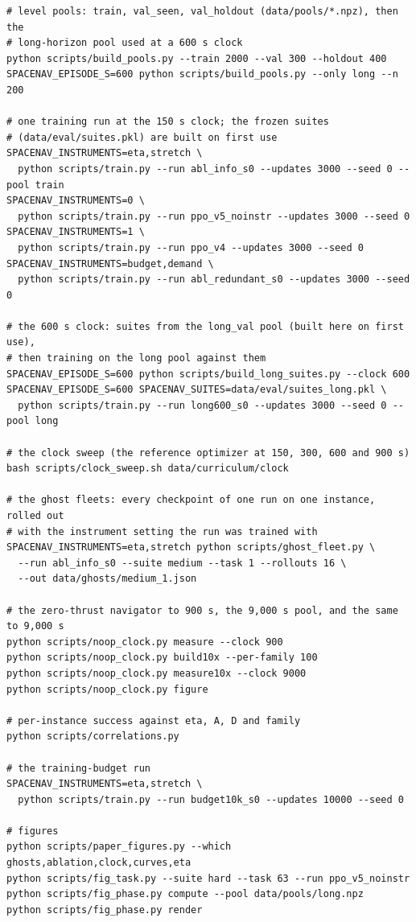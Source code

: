\begin{small}
\begin{verbatim}
# level pools: train, val_seen, val_holdout (data/pools/*.npz), then the
# long-horizon pool used at a 600 s clock
python scripts/build_pools.py --train 2000 --val 300 --holdout 400
SPACENAV_EPISODE_S=600 python scripts/build_pools.py --only long --n 200

# one training run at the 150 s clock; the frozen suites
# (data/eval/suites.pkl) are built on first use
SPACENAV_INSTRUMENTS=eta,stretch \
  python scripts/train.py --run abl_info_s0 --updates 3000 --seed 0 --pool train
SPACENAV_INSTRUMENTS=0 \
  python scripts/train.py --run ppo_v5_noinstr --updates 3000 --seed 0
SPACENAV_INSTRUMENTS=1 \
  python scripts/train.py --run ppo_v4 --updates 3000 --seed 0
SPACENAV_INSTRUMENTS=budget,demand \
  python scripts/train.py --run abl_redundant_s0 --updates 3000 --seed 0

# the 600 s clock: suites from the long_val pool (built here on first use),
# then training on the long pool against them
SPACENAV_EPISODE_S=600 python scripts/build_long_suites.py --clock 600
SPACENAV_EPISODE_S=600 SPACENAV_SUITES=data/eval/suites_long.pkl \
  python scripts/train.py --run long600_s0 --updates 3000 --seed 0 --pool long

# the clock sweep (the reference optimizer at 150, 300, 600 and 900 s)
bash scripts/clock_sweep.sh data/curriculum/clock

# the ghost fleets: every checkpoint of one run on one instance, rolled out
# with the instrument setting the run was trained with
SPACENAV_INSTRUMENTS=eta,stretch python scripts/ghost_fleet.py \
  --run abl_info_s0 --suite medium --task 1 --rollouts 16 \
  --out data/ghosts/medium_1.json

# the zero-thrust navigator to 900 s, the 9,000 s pool, and the same to 9,000 s
python scripts/noop_clock.py measure --clock 900
python scripts/noop_clock.py build10x --per-family 100
python scripts/noop_clock.py measure10x --clock 9000
python scripts/noop_clock.py figure

# per-instance success against eta, A, D and family
python scripts/correlations.py

# the training-budget run
SPACENAV_INSTRUMENTS=eta,stretch \
  python scripts/train.py --run budget10k_s0 --updates 10000 --seed 0

# figures
python scripts/paper_figures.py --which ghosts,ablation,clock,curves,eta
python scripts/fig_task.py --suite hard --task 63 --run ppo_v5_noinstr
python scripts/fig_phase.py compute --pool data/pools/long.npz
python scripts/fig_phase.py render
\end{verbatim}
\end{small}

